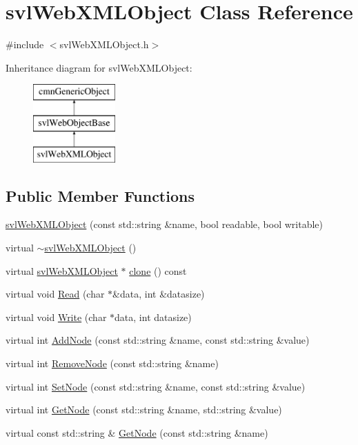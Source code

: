 \hypertarget{classsvl_web_x_m_l_object}{\section{svl\-Web\-X\-M\-L\-Object Class Reference}
\label{classsvl_web_x_m_l_object}
}


{\ttfamily \#include $<$svl\-Web\-X\-M\-L\-Object.\-h$>$}

Inheritance diagram for svl\-Web\-X\-M\-L\-Object\-:\begin{figure}[H]
\begin{center}
\leavevmode
\includegraphics[height=3.000000cm]{d9/d00/classsvl_web_x_m_l_object}
\end{center}
\end{figure}
\subsection*{Public Member Functions}
\begin{DoxyCompactItemize}
\item 
\hyperlink{classsvl_web_x_m_l_object_a6471e4cce2cddbaf7c68be312802814d}{svl\-Web\-X\-M\-L\-Object} (const std\-::string \&name, bool readable, bool writable)
\item 
virtual \hyperlink{classsvl_web_x_m_l_object_a030c007780e418b414bd369ec29168b0}{$\sim$svl\-Web\-X\-M\-L\-Object} ()
\item 
virtual \hyperlink{classsvl_web_x_m_l_object}{svl\-Web\-X\-M\-L\-Object} $\ast$ \hyperlink{classsvl_web_x_m_l_object_ae51b3264a837a7cae855cf8b12fa19a4}{clone} () const 
\item 
virtual void \hyperlink{classsvl_web_x_m_l_object_a3136311431e9ba3ab635c34af4efd81b}{Read} (char $\ast$\&data, int \&datasize)
\item 
virtual void \hyperlink{classsvl_web_x_m_l_object_a7117639987748c075a48fe1c9827f2cb}{Write} (char $\ast$data, int datasize)
\item 
virtual int \hyperlink{classsvl_web_x_m_l_object_abf7ad11eb2ce3e8e3861b697f859cd60}{Add\-Node} (const std\-::string \&name, const std\-::string \&value)
\item 
virtual int \hyperlink{classsvl_web_x_m_l_object_a7341c249a6e76a841e938fb3ab20ef65}{Remove\-Node} (const std\-::string \&name)
\item 
virtual int \hyperlink{classsvl_web_x_m_l_object_a0b9007c3bf7fbea492df3887f2a95363}{Set\-Node} (const std\-::string \&name, const std\-::string \&value)
\item 
virtual int \hyperlink{classsvl_web_x_m_l_object_aec17cc310165cfbeb52aada2a322a5f8}{Get\-Node} (const std\-::string \&name, std\-::string \&value)
\item 
virtual const std\-::string \& \hyperlink{classsvl_web_x_m_l_object_afacc8ffab951c7304953f195c6ebb743}{Get\-Node} (const std\-::string \&name)
\end{DoxyCompactItemize}
